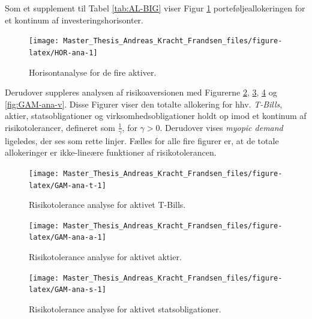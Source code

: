 \documentclass[
  a4paper,
  oneside]{memoir}
\begin{document}
Som et supplement til Tabel \ref{tab:AL-BIG} viser Figur \ref{fig:HOR-ana} porteføljeallokeringen for et kontinum af investeringshorisonter.

\begin{figure}[H]

{\centering \texttt{[image: Master\_Thesis\_Andreas\_Kracht\_Frandsen\_files/figure-latex/HOR-ana-1]} 

}

\caption{Horisontanalyse for de fire aktiver.}\label{fig:HOR-ana}
\end{figure}

Derudover suppleres analysen af risikoaversionen med Figurerne \ref{fig:GAM-ana-t}, \ref{fig:GAM-ana-a}, \ref{fig:GAM-ana-s} og \ref{fig:GAM-ana-v}. Disse Figurer viser den totalte allokering for hhv. \emph{T-Bills}, aktier, statsobligationer og virksomhedsobligationer holdt op imod et kontinum af risikotolerancer, defineret som \(\tfrac{1}{\gamma}\), for \(\gamma>0\). Derudover vises \emph{myopic demand} ligeledes, der ses som rette linjer. Fælles for alle fire figurer er, at de totale allokeringer er ikke-lineære funktioner af risikotolerancen.

\begin{figure}[H]

{\centering \texttt{[image: Master\_Thesis\_Andreas\_Kracht\_Frandsen\_files/figure-latex/GAM-ana-t-1]} 

}

\caption{Risikotolerance analyse for aktivet T-Bills.}\label{fig:GAM-ana-t}
\end{figure}

\begin{figure}[H]

{\centering \texttt{[image: Master\_Thesis\_Andreas\_Kracht\_Frandsen\_files/figure-latex/GAM-ana-a-1]} 

}

\caption{Risikotolerance analyse for aktivet aktier.}\label{fig:GAM-ana-a}
\end{figure}

\begin{figure}[H]

{\centering \texttt{[image: Master\_Thesis\_Andreas\_Kracht\_Frandsen\_files/figure-latex/GAM-ana-s-1]} 

}

\caption{Risikotolerance analyse for aktivet statsobligationer.}\label{fig:GAM-ana-s}
\end{figure}
\end{document}
